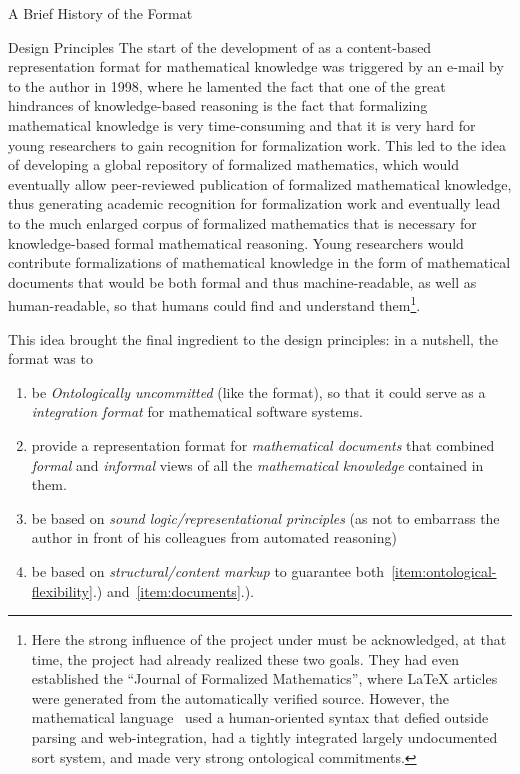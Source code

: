 \begin{omgroup}[id=omdoc-markup,short=Open Mathematical Documents]
\begin{omgroup}[id=omdoc-history]{A Brief History of the {\omdoc} Format}
\begin{omgroup}{Design Principles}
   The start of the development of {\omdoc} as a content-based representation format for
    mathematical knowledge was triggered by an e-mail by {} to the
    author in 1998, where he lamented the fact that one of the great hindrances of
    knowledge-based reasoning is the fact that formalizing mathematical knowledge is very
    time-consuming and that it is very hard for young researchers to gain recognition for
    formalization work. This led to the idea of developing a global repository of
    formalized mathematics, which would eventually allow peer-reviewed publication of
    formalized mathematical knowledge, thus generating academic recognition for
    formalization work and eventually lead to the much enlarged corpus of formalized
    mathematics that is necessary for knowledge-based formal mathematical reasoning. Young
    researchers would contribute formalizations of mathematical knowledge in the form of
    mathematical documents that would be both formal and thus machine-readable, as well as
    human-readable, so that humans could find and understand them\footnote{Here the strong
      influence of the {\mizar} project under {} must be
      acknowledged, at that time, the project had already realized these two goals. They
      had even established the ``Journal of Formalized Mathematics'', where {\LaTeX}
      articles were generated from the automatically verified {\mizar} source. However,
      the {\mizar} mathematical language~\cite{URL:MizarLanguage} used a human-oriented
      syntax that defied outside parsing and web-integration, had a tightly integrated
      largely undocumented sort system, and made very strong ontological commitments.}.
      
    This idea brought the final ingredient to the design principles: in a nutshell, the
    {\omdoc} format was to 
    \begin{enumerate}
    \item\label{item:ontological-flexibility} be {\emph{Ontologically uncommitted}} (like
      the {\openmath} format), so that it could serve as a {\emph{integration format}} for
      mathematical software systems.
    \item\label{item:documents} provide a representation format for {\emph{mathematical
          documents}} that combined {\emph{formal}} and {\emph{informal}} views of all the
      {\emph{mathematical knowledge}} contained in them.
    \item\label{item:logic} be based on {\emph{sound logic/representational principles}}
      (as not to embarrass the author in front of his colleagues from automated reasoning)
    \item\label{item:content-markup} be based on {\emph{structural/content markup}} to
      guarantee both~\ref{item:ontological-flexibility}.) and~\ref{item:documents}.).
    \end{enumerate}
  \end{omgroup}  
  

\end{omgroup}
\end{omgroup}
